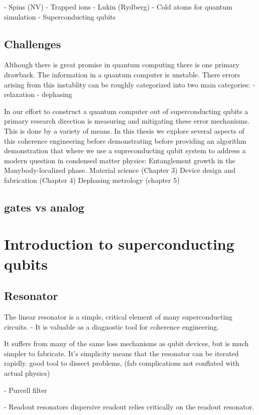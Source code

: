 - Spins (NV)
- Trapped ions
- Lukin (Rydberg)
- Cold atoms for quantum simulation
- Superconducting qubits

\section{Challenges}
Although there is great promise in quantum computing there is one primary drawback.
The information in a quantum computer is unstable.
There errors arising from this instablity can be roughly categorized into two main categories:
- relaxation
- dephasing


In our effort to construct a quantum computer out of superconducting qubits a primary research direction is measuring and mitigating these error mechanisms.
This is done by a variety of means.
In this thesis we explore several aspects of this coherence engineering before demonstrating before providing an algorithm demonstration that where we
use a supreconducting qubit system to address a modern question in condensed matter physics: Entanglement growth in the Manybody-localized phase.
Material science (Chapter 3)
Device design and fabrication (Chapter 4)
Dephasing metrology (chapter 5)

\section{gates vs analog}

\chapter{Introduction to superconducting qubits}

\section{Resonator}
The linear resonator is a simple, critical element of many superconducting circuits.
- It is valuable as a diagnostic tool for coherence engineering.

It suffers from many of the same loss mechanisms as qubit devices, but is much simpler to fabricate.
It's simplicity means that the resonator can be iterated rapidly.
good tool to dissect problems, (fab complications not conflated with actual physics)

- Purcell filter

- Readout resonators
dispersive readout relies critically on the readout resonator.

